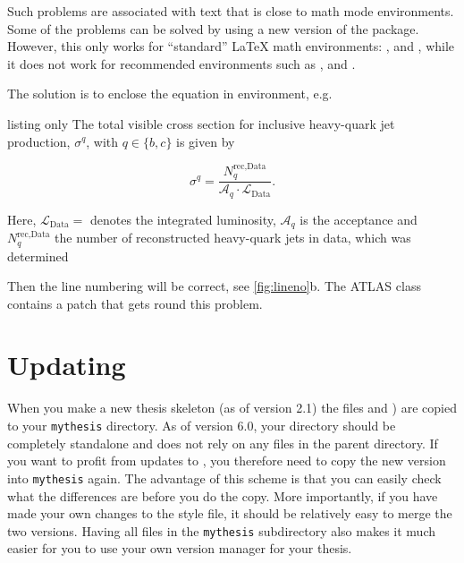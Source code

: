 Such problems are associated with text that is close to math mode environments.
Some of the problems can be solved by using a new
version of the  package.
However, this only works for \enquote{standard} \LaTeX{}
math environments: ,  and , while it does
not work for recommended  environments such as ,
 and . %

The solution is to enclose the equation in  environment, e.g.
\begin{tcblisting}{listing only}
The total visible cross section for inclusive heavy-quark jet
production, \(\sigma^{q}\), with \(q\in\{b,c\}\) is given by
\begin{linenomath}
\begin{equation*}
  \sigma^{q} = \frac{N_{q}^{\text{rec,Data}}}%
    {\mathcal{A}_{q}\cdot\mathcal{L}_{\text{Data}}}.
\end{equation*}
\end{linenomath}
Here, \(\mathcal{L}_{\text{Data}}=\) denotes the integrated luminosity,
\(\mathcal{A}_{q}\) is the acceptance and \(N_{q}^{\text{rec,Data}}\) the
number of reconstructed heavy-quark jets in data, which was determined
\end{tcblisting}
\noindent
Then the line numbering will be correct, see \cref{fig:lineno}b.
The ATLAS  class contains a patch that gets round this problem.


\section{Updating }%
\label{sec:tips:update}

When you make a new thesis skeleton (as of version 2.1) the files
 and ) are copied
to your \texttt{mythesis} directory.
As of version 6.0, your  directory should be completely standalone
and does not rely on any files in the parent directory.
If you want to profit from updates to ,
you therefore need to copy the new version into \texttt{mythesis} again.
The advantage of this scheme is
that you can easily check what the differences are before you do the
copy. More importantly, if you have made your own changes to the style
file, it should be relatively easy to merge the two versions. Having
all files in the \texttt{mythesis} subdirectory also makes it much easier
for you to use your own version manager for your thesis.

